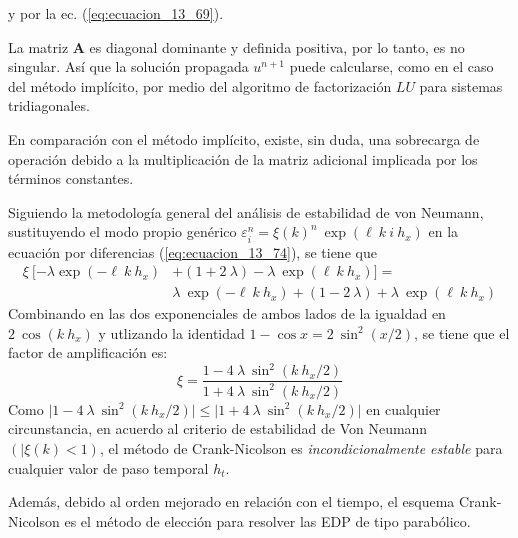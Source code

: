 y por la ec. (\ref{eq:ecuacion_13_69}).
\par
La matriz $\mathbf{A}$ es diagonal dominante y definida positiva, por lo tanto, es no singular. Así que la solución propagada $u^{n+1}$ puede calcularse, como en el caso del método implícito, por medio del algoritmo de factorización $LU$ para sistemas tridiagonales.
\par
En comparación con el método implícito, existe, sin duda, una sobrecarga de operación debido a la multiplicación de la matriz adicional implicada por los términos constantes.
\par
Siguiendo la metodología general del análisis de estabilidad de von Neumann, sustituyendo el modo propio genérico $\varepsilon_{i}^{n} = \xi(k)^{n} \: \exp(\ell \: k \: i \: h_{x})$ en la ecuación por diferencias (\ref{eq:ecuacion_13_74}), se tiene que
\begin{align*}
\xi \: [ - \lambda \exp(- \ell \: k \: h_{x}) &+ (1 + 2 \: \lambda) - \lambda \: \exp(\ell \: k \: h_{x})] =  \\
&{} \lambda \: \exp(- \ell \: k \: h_{x}) + (1 - 2 \: \lambda) + \lambda \: \exp(\ell \: k \: h_{x})
\end{align*}
Combinando en las dos exponenciales de ambos lados de la igualdad en $2 \: \cos(k \: h_{x})$ y utlizando la identidad $1 - \cos x = 2 \: \sin^{2}(x/2)$, se tiene que el factor de amplificación es:
\begin{equation}
\xi = \dfrac{1 - 4 \: \lambda \: \sin^{2}(k \: h_{x}/2)}{1 + 4 \: \lambda \: \sin^{2}(k \: h_{x}/2)}
\label{eq:ecuacion_13_77}
\end{equation}
Como $\vert 1 - 4 \: \lambda \: \sin^{2} (k \: h_{x}/2) \vert \leq \vert 1 + 4 \: \lambda \: \sin^{2} (k \: h_{x} / 2) \vert$ en cualquier circunstancia, en acuerdo al criterio de estabilidad de Von Neumann $(\vert \xi(k) < 1)$, el método de Crank-Nicolson es \emph{incondicionalmente estable} para cualquier valor de paso temporal $h_{t}$.
\par
Además, debido al orden mejorado en relación con el tiempo, el esquema Crank-Nicolson es el método de elección para resolver las EDP de tipo parabólico.
